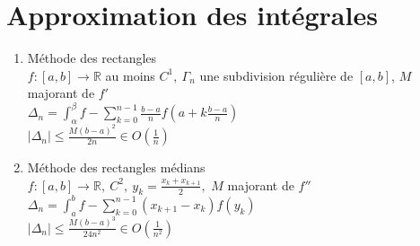 \documentclass[fleqn]{article}
\theoremstyle{definition} \newtheorem*{defi}{D\'efinition}
\theoremstyle{definition} \newtheorem*{theo}{Th\'eor\`eme}
\theoremstyle{definition} \newtheorem*{coro}{Corollaire}
\theoremstyle{remark} \newtheorem*{rqs}{Remarques}
\theoremstyle{definition} \newtheorem*{prop}{Propri\'et\'e}
\begin{document}
\section{Approximation des int\'egrales}
\begin{enumerate}
	\item M\'ethode des rectangles \\
		$f:[a,b] \rightarrow \mathbb{R}$ au moins $C^1,\ \Gamma_n$ une subdivision r\'eguli\`ere de $[a,b]$, $M$ majorant de $f'$ \\
		$\Delta_n = \int_\alpha^\beta f - \sum_{k=0}^{n-1} \frac{b-a}{n} f(a + k\frac{b-a}{n})$ \\
		$|\Delta_n| \leq \frac{M(b-a)^2}{2n} \in O(\frac{1}{n})$
	\item M\'ethode des rectangles m\'edians \\
		$f:[a,b] \rightarrow \mathbb{R},\ C^2,\ y_k = \frac{x_k + x_{k+1}}{2},$ $M$ majorant de $f''$\\
		$\Delta_n = \int_a^b f - \sum_{k=0}^{n-1} (x_{k+1} - x_k)f(y_k)$ \\
		$|\Delta_n| \leq \frac{M(b-a)^3}{24n^2} \in O(\frac{1}{n^2})$

\end{enumerate}
\end{document}
